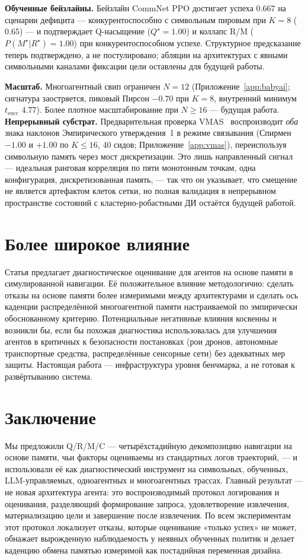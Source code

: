 \documentclass{article}
\begin{document}
\textbf{Обученные бейзлайны.} Бейзлайн CommNet PPO достигает успеха $0.667$ на сценарии дефицита --- конкурентоспособно с символьным пировым при $K{=}8$ ($0.65$) --- и подтверждает Q-насыщение ($Q^\star{=}1.00$) и коллапс R/M ($P(M^\star|R^\star){=}1.00$) при конкурентоспособном успехе. Структурное предсказание теперь подтверждено, а не постулировано; абляции на архитектурах с явными символьными каналами фиксации цели оставлены для будущей работы.

\textbf{Масштаб.} Многоагентный свип ограничен $N{=}12$ (Приложение~\ref{app:babyai}; сигнатура заостряется, пиковый Пирсон $-0.70$ при $K{=}8$, внутренний минимум $t_{\mathrm{succ}}$ $4.77$). Более плотное масштабирование при $N{\ge}16$ --- будущая работа.
\textbf{Непрерывный субстрат.} Предварительная проверка VMAS~\citep{bettini2022vmas} воспроизводит \emph{оба} знака наклонов Эмпирического утверждения~1 в режиме связывания (Спирмен $-1.00$ и $+1.00$ по $K{\le}16$, 40 сидов; Приложение~\ref{app:vmas}), переиспользуя символьную память через мост дискретизации. Это лишь направленный сигнал --- идеальная ранговая корреляция по пяти монотонным точкам, одна конфигурация, дискретизованная память, --- так что он указывает, что смещение не является артефактом клеток сетки, но полная валидация в непрерывном пространстве состояний с кластерно-робастными ДИ остаётся будущей работой.

\section{Более широкое влияние}

Статья предлагает диагностическое оценивание для агентов на основе памяти в симулированной навигации. Её положительное влияние методологично: сделать отказы на основе памяти более измеримыми между архитектурами и сделать ось каденции распределённой многоагентной памяти настраиваемой по эмпирически обоснованному критерию. Потенциальные негативные влияния косвенны и возникли бы, если бы похожая диагностика использовалась для улучшения агентов в критичных к безопасности постановках (рои дронов, автономные транспортные средства, распределённые сенсорные сети) без адекватных мер защиты. Настоящая работа --- инфраструктура уровня бенчмарка, а не готовая к развёртыванию система.

\section{Заключение}

Мы предложили Q/R/M/C --- четырёхстадийную декомпозицию навигации на основе
памяти, чьи факторы оцениваемы из стандартных логов траекторий, ---
и использовали её как диагностический инструмент на символьных, обученных,
LLM-управляемых, одноагентных и многоагентных трассах. Главный результат ---
не новая архитектура агента: это воспроизводимый протокол логирования и
оценивания, разделяющий формирование запроса, удовлетворение
извлечения, материализацию цели и завершение после извлечения.
По всем экспериментам этот протокол локализует отказы, которые
оценивание «только успех» не может, обнажает вырожденную наблюдаемость у
неявных обученных политик и делает каденцию обмена памятью измеримой
как постадийная переменная дизайна.
\end{document}
